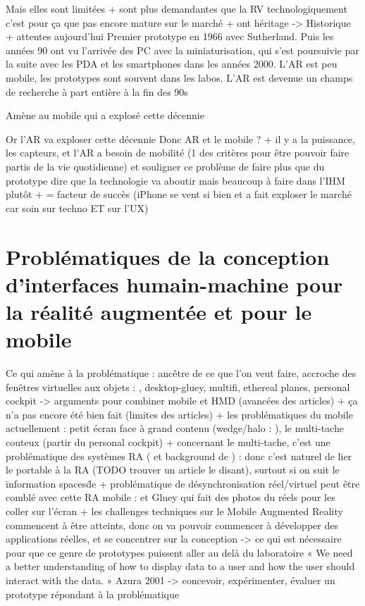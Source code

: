 Mais elles sont limitées + sont plus demandantes que la RV technologiquement c'est pour ça que pas encore mature sur le marché + ont héritage -> Historique + attentes aujourd'hui
Premier prototype en 1966 avec Sutherland. Puis les années 90 ont vu l'arrivée des PC avec la miniaturisation, qui s'est poursuivie par la suite avec les PDA et les smartphones dans les années 2000. L'AR est peu mobile, les prototypes sont souvent dans les labos. L'AR est devenue un champs de recherche à part entière à la fin des 90s

Amène au mobile qui a explosé cette décennie

Or l'AR va exploser cette décennie
Donc AR et le mobile ? + il y a la puissance, les capteurs, et l'AR a besoin de mobilité (1 des critères pour être pouvoir faire partis de la vie quotidienne) \citep{VanKrevelenPoelman2010} et souligner ce problème de faire plus que du prototype \cite{HuangHuiPeyloEtAl2013}
dire que la technologie va aboutir mais beaucoup à faire dans l'IHM plutôt + = facteur de succès (iPhone se vent si bien et a fait exploser le marché car soin sur techno ET sur l'UX)


\section*{Problématiques de la conception d'interfaces humain-machine pour la réalité augmentée et pour le mobile}
Ce qui amène à la problématique : ancêtre de ce que l'on veut faire, accroche des fenêtres virtuelles aux objets : \cite{FeinerMacIntyreHauptEtAl1993}, desktop-gluey, multifi, ethereal planes, personal cockpit -> arguments pour combiner mobile et HMD (avancées des articles) + ça n'a pas encore été bien fait (limites des articles)
+ les problématiques du mobile actuellement : petit écran face à grand contenu (wedge/halo : \cite{BaudischRosenholtz2003} \cite{GustafsonBaudischGutwinEtAl2008} \cite{BurigatChittaro2011}), le multi-tache couteux (partir du personal cockpit)
+ concernant le multi-tache, c'est une problématique des systèmes RA (\cite{SchmalstiegFuhrmannHesinaEtAl2002} et background de \cite{EnsFinneganIrani2014}) : donc c'est naturel de lier le portable à la RA (TODO trouver un article le disant), surtout si on suit le \"information spaces\" de \cite{EnsHincapie-RamosIrani2014}
+ problématique de désynchronisation réel/virtuel peut être comblé avec cette RA mobile : \cite{Chalon2004} et Gluey qui fait des photos du réels pour les coller sur l'écran
+ les challenges techniques sur le Mobile Augmented Reality commencent à être atteints, donc on va pouvoir commencer à développer des applications réelles, et se concentrer sur la conception -> ce qui est nécessaire pour que ce genre de prototypes puissent aller au delà du laboratoire
« We need a better understanding of how to display data
to a user and how the user should interact with the data. » Azura 2001
-> concevoir, expérimenter, évaluer un prototype répondant à la problématique

